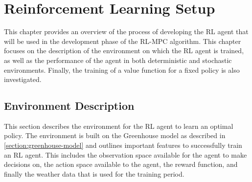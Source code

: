 \chapter{Reinforcement Learning Setup}
\label{chapter:RL}
This chapter provides an overview of the process of developing the RL agent that will be used in the development phase of the RL-MPC algorithm. This chapter focuses on the description of the environment on which the RL agent is trained, as well as the performance of the agent in both deterministic and stochastic environments. Finally, the training of a value function for a fixed policy is also investigated. 

\section{Environment Description} \label{section:env-description}
This section describes the environment for the RL agent to learn an optimal policy. The environment is built on the Greenhouse model as described in \autoref{section:greenhouse-model} and outlines important features to successfully train an RL agent. This includes the observation space available for the agent to make decisions on, the action space available to the agent, the reward function, and finally the weather data that is used for the training period.

